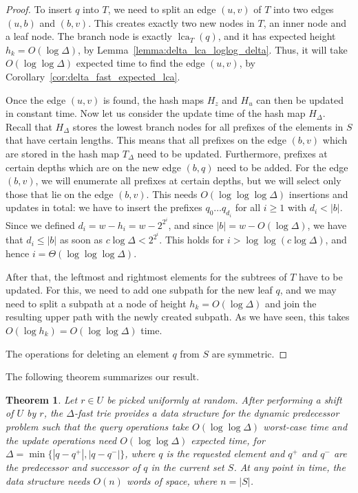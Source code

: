 \documentclass[a4paper,11pt]{article}
\newtheorem{theorem} {Theorem}[section]
\newcommand{\?}{\mskip1.5mu}
\DeclareMathOperator{\lca}{lca} %
\begin{document}
\begin{proof}
To insert $q$ into $T$, we need to split an edge $(u,v)$ of $T$ into
two edges $(u,b)$ and $(b,v)$. This creates
exactly two new nodes in $T$, an inner node and a leaf node. 
The branch node is exactly $\lca_T(q)$, and it has expected height 
$h_k = O(\log \Delta)$, by Lemma~\ref{lemma:delta_lca_loglog_delta}. 
Thus, it will
take $O(\log\log \Delta)$ expected time to find
the edge $(u,v)$, by
Corollary~\ref{cor:delta_fast_expected_lca}.

Once the edge $(u,v)$ is found, the hash maps $H_z$ and $H_u$ 
can then be updated in constant time.
Now let us consider the update time of the 
hash map $H_\Delta$. Recall that
$H_\Delta$ stores the lowest branch nodes for all prefixes
of the elements in $S$ that have certain lengths.
This means that all prefixes on the edge $(b,v)$ which 
are stored in the hash map $T_\Delta$ need to
be updated. Furthermore, prefixes at certain depths which 
are on the new edge $(b,q)$ need to
be added. For the edge $(b,v)$, we will enumerate 
all prefixes at certain depths, but we will select only those that 
lie on the edge $(b,v)$. This needs
$O(\log\log\log\Delta)$ insertions and updates in total: we
have to insert the prefixes $q_0 \dots q_{d_i}$ for all 
$i \geq 1$ with $d_i < |b|$. Since we defined 
$d_i = w - h_i = w - 2^{2^i}$, 
and since $|b| = w - O(\log \Delta)$, 
we have that $d_i \leq |b|$ as soon as 
$c \log\Delta < 2^{2^i}$. This holds for 
$i > \log\log (c\log \Delta)$, and hence $i =
\Theta(\log\log\log\Delta)$.

After that, the leftmost and rightmost elements for the subtrees
of $T$ have to be updated. For this, we need to add one
subpath for the new leaf $q$, and we may need to split
a subpath at a node of height $h_k = O(\log \Delta)$ and join
the resulting upper path with the newly created subpath. As we
have seen, this takes $O(\log h_k) = O(\log \log \Delta)$ time.

The operations for deleting an element $q$ from $S$ are symmetric.
\end{proof}

The following theorem summarizes our result.

\begin{theorem}
Let $r \in U$ be picked uniformly at random.
After performing a shift of $U$ by $r$, 
the $\Delta$-fast trie provides a data structure for the
dynamic predecessor problem such that the 
query operations take $O(\log \log \Delta)$ worst-case time and 
the update operations need $O(\log \log \Delta)$ expected
time, for $\Delta = \min \{|q-q^+|, |q-q^-|\}$, where $q$ is the
requested element and $q^+$ and $q^-$ are the predecessor and
successor of $q$ in the current set $S$. At any point in time, 
the data structure needs $O(n)$ words of space, where $n = |S|$.
\end{theorem}
\end{document}
